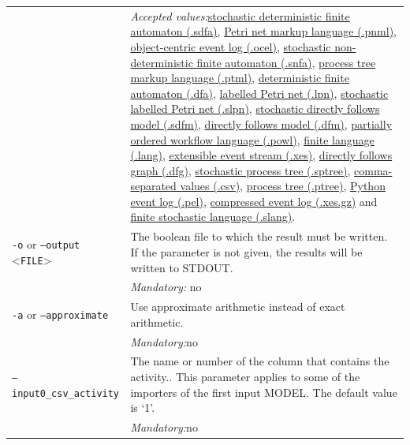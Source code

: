 {\begin{tabularx}{\linewidth}{lX}
&\textit{Accepted values:}\quad \hyperref[filehandler:stochastic deterministic finite automaton]{stochastic deterministic finite automaton (.sdfa)}, \hyperref[filehandler:Petri net markup language]{Petri net markup language (.pnml)}, \hyperref[filehandler:object-centric event log]{object-centric event log (.ocel)}, \hyperref[filehandler:stochastic non-deterministic finite automaton]{stochastic non-deterministic finite automaton (.snfa)}, \hyperref[filehandler:process tree markup language]{process tree markup language (.ptml)}, \hyperref[filehandler:deterministic finite automaton]{deterministic finite automaton (.dfa)}, \hyperref[filehandler:labelled Petri net]{labelled Petri net (.lpn)}, \hyperref[filehandler:stochastic labelled Petri net]{stochastic labelled Petri net (.slpn)}, \hyperref[filehandler:stochastic directly follows model]{stochastic directly follows model (.sdfm)}, \hyperref[filehandler:directly follows model]{directly follows model (.dfm)}, \hyperref[filehandler:partially ordered workflow language]{partially ordered workflow language (.powl)}, \hyperref[filehandler:finite language]{finite language (.lang)}, \hyperref[filehandler:extensible event stream]{extensible event stream (.xes)}, \hyperref[filehandler:directly follows graph]{directly follows graph (.dfg)}, \hyperref[filehandler:stochastic process tree]{stochastic process tree (.sptree)}, \hyperref[filehandler:comma-separated values]{comma-separated values (.csv)}, \hyperref[filehandler:process tree]{process tree (.ptree)}, \hyperref[filehandler:Python event log]{Python event log (.pel)}, \hyperref[filehandler:compressed event log]{compressed event log (.xes.gz)} and \hyperref[filehandler:finite stochastic language]{finite stochastic language (.slang)}.\\
\texttt{-o} or \texttt{--output} <\texttt{FILE}> &
The boolean file to which the result must be written. If the parameter is not given, the results will be written to STDOUT.\\
&\textit{Mandatory:} \quad no\\
\texttt{-a} or \texttt{--approximate} & Use approximate arithmetic instead of exact arithmetic.\\
&\textit{Mandatory:}\quad no\\
\texttt{--input0\_csv\_activity} & The name or number of the column that contains the activity.. This parameter applies to some of the importers of the first input MODEL. The default value is `1'.\\
&\textit{Mandatory:}\quad no\\

\end{tabularx}}
